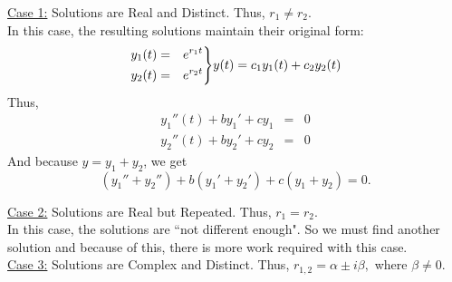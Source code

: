 \documentclass[10pt]{article}
\newenvironment{rcases}
  {\left.\begin{aligned}}
  {\end{aligned}\right\rbrace}
\begin{document}
    \underline{Case 1:} Solutions are Real and Distinct. Thus, $r_1\neq r_2$.\\
    In this case, the resulting solutions maintain their original form:
    \begin{eqnarray*}
        \begin{rcases}
        y_1(t)&=&e^{r_1 t}\\
        y_2(t)&=&e^{r_2 t}
        \end{rcases}
        y(t)=c_1 y_1(t)+c_2 y_2(t)
    \end{eqnarray*}
    Thus,
    \begin{eqnarray*}
        y_1''(t)+by_1'+cy_1&=&0\\
        y_2''(t)+by_2'+cy_2&=&0
    \end{eqnarray*}
    And because $y=y_1+y_2$, we get
    $$(y_1''+y_2'')+b(y_1'+y_2')+c(y_1+y_2)=0.$$
    
    \underline{Case 2:} Solutions are Real but Repeated. Thus, $r_1=r_2$.\\
    In this case, the solutions are ``not different enough". So we must find another solution and because of this, there is more work required with this case.\\

    \underline{Case 3:} Solutions are Complex and Distinct. Thus, $r_{1,2}=\alpha\pm i\beta,$ where $\beta\neq 0$.\\
    
\end{document}
